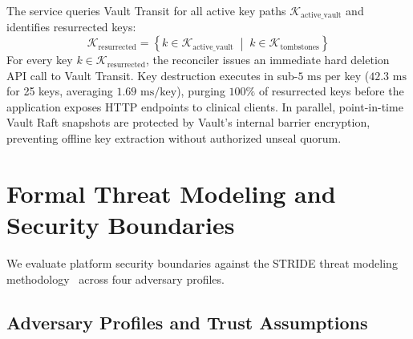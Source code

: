 The service queries Vault Transit for all active key paths $\mathcal{K}_{\text{active\_vault}}$ and identifies resurrected keys:
\begin{equation}
    \mathcal{K}_{\text{resurrected}} = \left\{ k \in \mathcal{K}_{\text{active\_vault}} \;\middle|\; k \in \mathcal{K}_{\text{tombstones}} \right\}
    \label{eq:tombstone-reconciliation}
\end{equation}
For every key $k \in \mathcal{K}_{\text{resurrected}}$, the reconciler issues an immediate hard deletion API call to Vault Transit. Key destruction executes in sub-$5\text{~ms}$ per key ($42.3\text{~ms}$ for 25 keys, averaging $1.69\text{~ms/key}$), purging $100\%$ of resurrected keys before the application exposes HTTP endpoints to clinical clients. In parallel, point-in-time Vault Raft snapshots are protected by Vault's internal barrier encryption, preventing offline key extraction without authorized unseal quorum.


\section{Formal Threat Modeling and Security Boundaries}\label{section:stride-analysis}

We evaluate platform security boundaries against the STRIDE threat modeling methodology~\cite{owasp_threat_modeling} across four adversary profiles.

\subsection{Adversary Profiles and Trust Assumptions}

